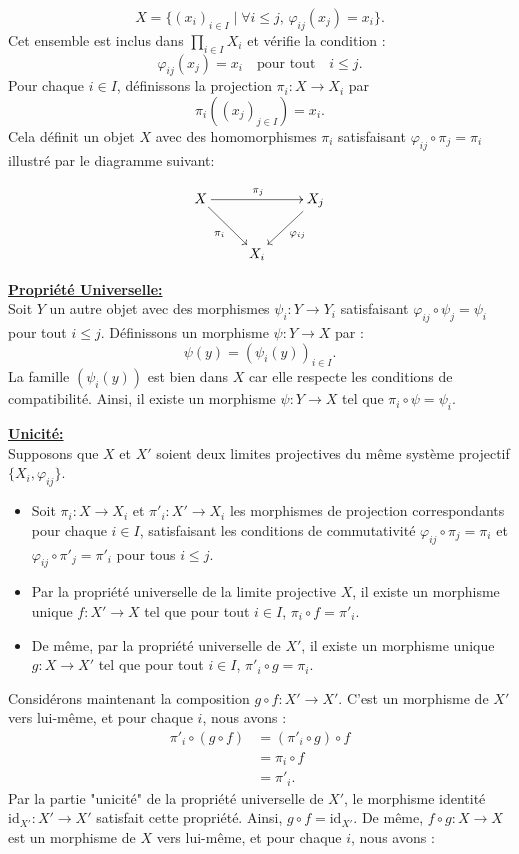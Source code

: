 \documentclass[a4paper, 14pt]{report}
\begin{document}
\begin{onehalfspace}
{\[
X = \{(x_i)_{i \in I} \mid \forall i \leq j, \, \varphi_{ij}(x_j) = x_i\}.
\]
Cet ensemble est inclus dans \(\prod_{i \in I} X_i\) et vérifie la condition :\\
\[
\varphi_{ij}(x_j) = x_i \quad \text{pour tout} \quad i \leq j.
\]
Pour chaque \(i \in I\), définissons la projection \(\pi_i : X \to X_i\) par 
\[
\pi_i((x_j)_{j \in I}) = x_i.
\]
Cela définit un objet \(X\) avec des homomorphismes \(\pi_i\) satisfaisant \(\varphi_{ij} \circ \pi_j = \pi_i\) illustré par le diagramme suivant:

\[
\xymatrix{
	X \ar[rr]^{\pi_{j}} \ar[dr]_{\pi_i} & & X_{j} \ar[dl]^{\varphi_{ij}} \\
	& X_{i} &
}
\]


\textbf{\underline{Propriété Universelle:}}\\
Soit \(Y\) un autre objet avec des morphismes \(\psi_i : Y \to Y_i\) satisfaisant \(\varphi_{ij} \circ \psi_j = \psi_i\) pour tout \(i \leq j\). Définissons un morphisme \(\psi : Y \to X\) par :
\[
\psi(y) = (\psi_i(y))_{i \in I}.
\]
La famille \((\psi_i(y))\) est bien dans \(X\) car elle respecte les conditions de compatibilité. Ainsi, il existe un morphisme \(\psi : Y \to X\) tel que \(\pi_i \circ \psi = \psi_i\).

\textbf{\underline{Unicité:}}\\
Supposons que \(X\) et \(X'\) soient deux limites projectives du même système projectif \(\{X_i, \varphi_{ij}\}\).

\begin{itemize}
	\item Soit \(\pi_i : X \to X_i\) et \(\pi'_i : X' \to X_i\) les morphismes de projection correspondants pour chaque \(i \in I\), satisfaisant les conditions de commutativité \(\varphi_{ij} \circ \pi_j = \pi_i\) et \(\varphi_{ij} \circ \pi'_j = \pi'_i\) pour tous \(i \leq j\).
	\item Par la propriété universelle de la limite projective \(X\), il existe un morphisme unique \(f : X' \to X\) tel que pour tout \(i \in I\), \(\pi_i \circ f = \pi'_i\).
	\item De même, par la propriété universelle de \(X'\), il existe un morphisme unique \(g : X \to X'\) tel que pour tout \(i \in I\), \(\pi'_i \circ g = \pi_i\).
\end{itemize}

Considérons maintenant la composition \(g \circ f : X' \to X'\). C'est un morphisme de \(X'\) vers lui-même, et pour chaque \(i\), nous avons :
\[
\begin{aligned}
	\pi'_i \circ (g \circ f) &= (\pi'_i \circ g) \circ f \\
	&= \pi_i \circ f \\
	&= \pi'_i.
\end{aligned}
\]
Par la partie "unicité" de la propriété universelle de \(X'\), le morphisme identité \(\text{id}_{X'} : X' \to X'\) satisfait cette propriété. Ainsi, \(g \circ f = \text{id}_{X'}\).
De même, \(f \circ g : X \to X\) est un morphisme de \(X\) vers lui-même, et pour chaque \(i\), nous avons :

}
\end{onehalfspace}
\end{document}
